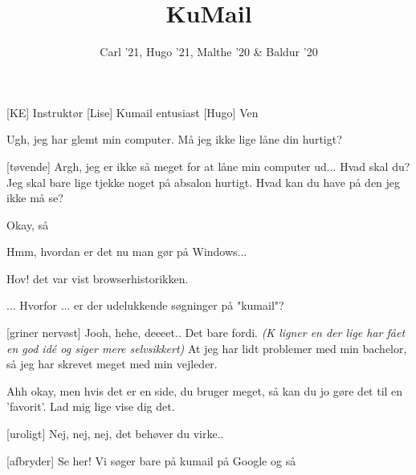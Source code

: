 \documentclass[a4paper,11pt]{article}
\title{KuMail}
\author{Carl '21, Hugo '21, Malthe '20 \& Baldur '20}
\begin{document}
\maketitle

\begin{roles}
[KE] Instruktør
[Lise] Kumail entusiast
[Hugo] Ven
\end{roles}

\begin{sketch}

 Ugh, jeg har glemt min computer. Må jeg ikke lige låne din hurtigt?

[tøvende] Argh, jeg er ikke så meget for at låne min computer ud... Hvad skal du?
 Jeg skal bare lige tjekke noget på absalon hurtigt. Hvad kan du have på den jeg ikke må se?


 Okay, så 


 Hmm, hvordan er det nu man gør på Windows...


 Hov! det var vist browserhistorikken.


 ... Hvorfor ... er der udelukkende søgninger på "kumail"?

[griner nervøst] Jooh, hehe, deeeet.. Det bare fordi. \textit{(K ligner en der lige har fået en god idé og siger mere selvsikkert)} At jeg har lidt problemer med min bachelor, så jeg har skrevet meget med min vejleder.

 Ahh okay, men hvis det er en side, du bruger meget, så kan du jo gøre det til en 'favorit'. Lad mig lige vise dig det.

[uroligt] Nej, nej, nej, det behøver du virke..

[afbryder] Se her! Vi søger bare på kumail på Google og så



\end{sketch}
\end{document}
